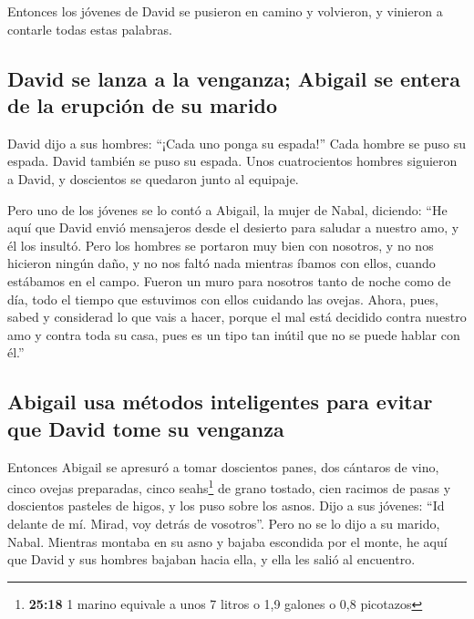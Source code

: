 \begin{paracol}{2}
 Entonces los jóvenes de David se pusieron en camino y
volvieron, y vinieron a contarle todas estas palabras.

\hypertarget{david-se-lanza-a-la-venganza-abigail-se-entera-de-la-erupciuxf3n-de-su-marido}{%
\subsection{David se lanza a la venganza; Abigail se entera de la
erupción de su
marido}\label{david-se-lanza-a-la-venganza-abigail-se-entera-de-la-erupciuxf3n-de-su-marido}}

 David dijo a sus hombres: ``¡Cada uno ponga su espada!''
Cada hombre se puso su espada. David también se puso su espada. Unos
cuatrocientos hombres siguieron a David, y doscientos se quedaron junto
al equipaje.

 Pero uno de los jóvenes se lo contó a Abigail, la mujer
de Nabal, diciendo: ``He aquí que David envió mensajeros desde el
desierto para saludar a nuestro amo, y él los insultó. 
Pero los hombres se portaron muy bien con nosotros, y no nos hicieron
ningún daño, y no nos faltó nada mientras íbamos con ellos, cuando
estábamos en el campo.  Fueron un muro para nosotros
tanto de noche como de día, todo el tiempo que estuvimos con ellos
cuidando las ovejas.  Ahora, pues, sabed y considerad lo
que vais a hacer, porque el mal está decidido contra nuestro amo y
contra toda su casa, pues es un tipo tan inútil que no se puede hablar
con él.''

\hypertarget{abigail-usa-muxe9todos-inteligentes-para-evitar-que-david-tome-su-venganza}{%
\subsection{Abigail usa métodos inteligentes para evitar que David tome
su
venganza}\label{abigail-usa-muxe9todos-inteligentes-para-evitar-que-david-tome-su-venganza}}

 Entonces Abigail se apresuró a tomar doscientos panes,
dos cántaros de vino, cinco ovejas preparadas, cinco seahs\footnote{\textbf{25:18}
  1 marino equivale a unos 7 litros o 1,9 galones o 0,8 picotazos} de
grano tostado, cien racimos de pasas y doscientos pasteles de higos, y
los puso sobre los asnos.  Dijo a sus jóvenes: ``Id
delante de mí. Mirad, voy detrás de vosotros''. Pero no se lo dijo a su
marido, Nabal.  Mientras montaba en su asno y bajaba
escondida por el monte, he aquí que David y sus hombres bajaban hacia
ella, y ella les salió al encuentro.


\end{paracol}
